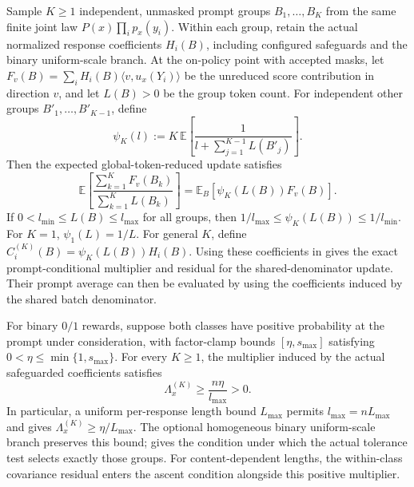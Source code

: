 \begin{proposition}
\label{prop:batch-denominator}
Sample $K\ge1$ independent, unmasked prompt groups $B_1,\ldots,B_K$
from the same finite joint law $P(x)\prod_i p_x(y_i)$. Within each group,
retain the actual normalized response coefficients $H_i(B)$, including
configured safeguards and the binary uniform-scale branch. At the on-policy
point with accepted masks, let
$F_v(B)=\sum_i H_i(B)\langle v,u_x(Y_i)\rangle$ be the unreduced score
contribution in direction $v$, and let $L(B)>0$ be the group token count.
For independent other groups $B'_1,\ldots,B'_{K-1}$, define
\[
 \psi_K(l):=K\,\mathbb E\!\left[
  \frac{1}{l+\sum_{j=1}^{K-1}L(B'_j)}\right].
\]
Then the expected global-token-reduced update satisfies
\begin{equation}
 \mathbb E\!\left[\frac{\sum_{k=1}^K F_v(B_k)}
                           {\sum_{k=1}^K L(B_k)}\right]
 =\mathbb E_B[\psi_K(L(B))F_v(B)].
 \label{eq:batch-denominator}
\end{equation}
If $0<l_{\min}\le L(B)\le l_{\max}$ for all groups, then
$1/l_{\max}\le\psi_K(L(B))\le1/l_{\min}$.
For $K=1$, $\psi_1(L)=1/L$. For general $K$, define
$C_i^{(K)}(B)=\psi_K(L(B))H_i(B)$.
Using these coefficients in  gives the
exact prompt-conditional multiplier and residual for the shared-denominator
update. Their prompt average can then be evaluated by
 using the coefficients induced by the shared
batch denominator.

For binary $0/1$ rewards, suppose both classes have positive probability
at the prompt under consideration, with factor-clamp bounds
$[\eta,s_{\max}]$ satisfying $0<\eta\le\min\{1,s_{\max}\}$. For every $K\ge1$, the multiplier induced
by the actual safeguarded coefficients satisfies
\begin{equation}
 \Lambda_x^{(K)}\ge\frac{n\eta}{l_{\max}}>0.
 \label{eq:shared-batch-multiplier}
\end{equation}
In particular, a uniform per-response length bound $L_{\max}$ permits
$l_{\max}=nL_{\max}$ and gives $\Lambda_x^{(K)}\ge\eta/L_{\max}$.
The optional homogeneous binary uniform-scale branch preserves this bound;
 gives the condition under which the actual
tolerance test selects exactly those groups.
For content-dependent lengths, the within-class covariance residual enters
the ascent condition alongside this positive multiplier.
\end{proposition}
